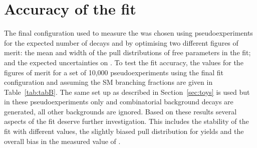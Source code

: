 \section{Accuracy of the fit}
\label{sec:fitaccuracy}
The final configuration used to measure the \el was chosen using pseudoexperiments for the expected number of decays and by optimising two different figures of merit: the mean and width of the pull distributions of free parameters in the fit; and the expected uncertainties on \tmumu. To test the fit accuracy, the values for the figures of merit for a set of 10,000 pseudoexperiments using the final fit configuration and assuming the SM \bmumu branching fractions are given in Table~\ref{tab:tabB}. The same set up as described in Section~\ref{sec:toys} is used but in these pseudoexperiments only \bsmumu and combinatorial background decays are generated, all other backgrounds are ignored. 
Based on these results several aspects of the fit deserve further investigation. This includes the stability of the fit with different \tmumu values, the slightly biased pull distribution for \bsmumu yields and the overall bias in the measured value of \tmumu. 

